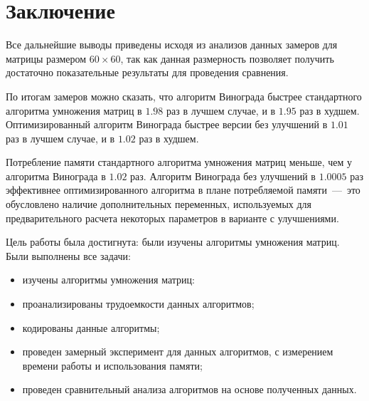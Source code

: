 \chapter*{Заключение}

Все дальнейшие выводы приведены исходя из анализов данных замеров для матрицы размером $60 \times 60$, так как данная размерность позволяет получить достаточно показательные результаты для проведения сравнения.

По итогам замеров можно сказать, что алгоритм Винограда быстрее стандартного алгоритма умножения матриц в $1.98$ раз в лучшем случае, и в $1.95$ раз в худшем. Оптимизированный алгоритм Винограда быстрее версии без улучшений в $1.01$ раз в лучшем случае, и в $1.02$ раз в худшем.

Потребление памяти стандартного алгоритма умножения матриц меньше, чем у алгоритма Винограда в $1.02$ раз. Алгоритм Винограда без улучшений в $1.0005$ раз эффективнее оптимизированного алгоритма в плане потребляемой памяти~---~это обусловлено наличие дополнительных переменных, используемых для предварительного расчета некоторых параметров в варианте с улучшениями.

Цель работы была достигнута: были изучены алгоритмы умножения матриц. Были выполнены все задачи:

\begin{itemize}
	\item изучены алгоритмы умножения матриц:
	\item проанализированы трудоемкости данных алгоритмов;
	\item кодированы данные алгоритмы;
	\item проведен замерный эксперимент для данных алгоритмов, с измерением времени работы и использования памяти; 
	\item проведен сравнительный анализа алгоритмов на основе полученных данных.
\end{itemize}


\newpage